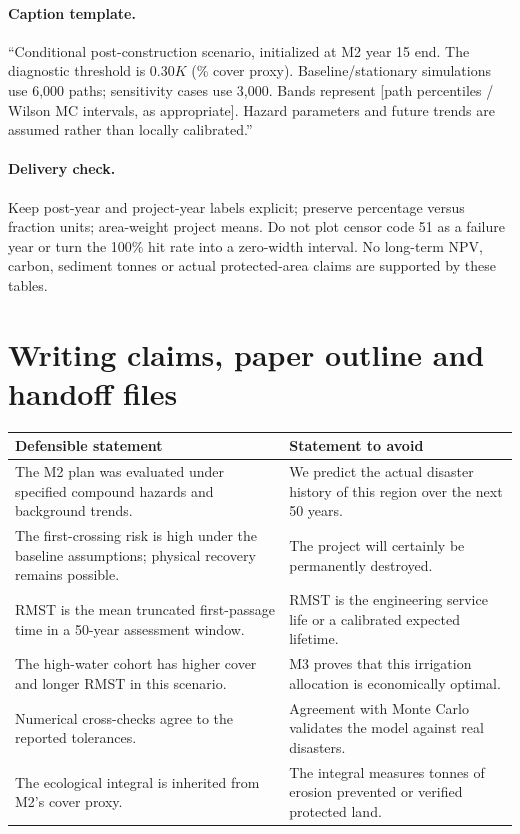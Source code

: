 \documentclass[11pt,a4paper]{article}
\begin{document}
\paragraph{Caption template.}
``Conditional post-construction scenario, initialized at M2 year 15 end. The diagnostic threshold is
$0.30K$ (\Threshold\% cover proxy). Baseline/stationary simulations use 6,000 paths; sensitivity cases use
3,000. Bands represent [path percentiles / Wilson MC intervals, as appropriate]. Hazard parameters
and future trends are assumed rather than locally calibrated.''

\paragraph{Delivery check.}
Keep post-year and project-year labels explicit; preserve percentage versus fraction units; area-weight
project means. Do not plot censor code 51 as a failure year or turn the 100\% hit rate into a zero-width
interval. No long-term NPV, carbon, sediment tonnes or actual protected-area claims are supported by these tables.

\clearpage
\section{Writing claims, paper outline and handoff files}
\small
\begin{tabularx}{\textwidth}{@{}YY@{}}
\toprule Defensible statement & Statement to avoid \\\midrule
The M2 plan was evaluated under specified compound hazards and background trends. & We predict the actual disaster history of this region over the next 50 years. \\
The first-crossing risk is high under the baseline assumptions; physical recovery remains possible. & The project will certainly be permanently destroyed. \\
RMST is the mean truncated first-passage time in a 50-year assessment window. & RMST is the engineering service life or a calibrated expected lifetime. \\
The high-water cohort has higher cover and longer RMST in this scenario. & M3 proves that this irrigation allocation is economically optimal. \\
Numerical cross-checks agree to the reported tolerances. & Agreement with Monte Carlo validates the model against real disasters. \\
The ecological integral is inherited from M2's cover proxy. & The integral measures tonnes of erosion prevented or verified protected land. \\
\bottomrule
\end{tabularx}
\end{document}
